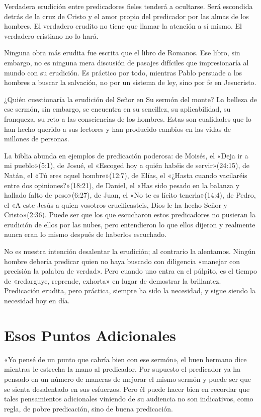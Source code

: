 \documentclass[12pt, twoside, openright]{book}
\begin{document}
Verdadera erudición entre predicadores fieles tenderá a ocultarse. Será escondida detrás de la cruz de Cristo y el amor propio del predicador por las almas de los hombres. El verdadero erudito no tiene que llamar la atención a sí mismo. El verdadero cristiano no lo hará.

Ninguna obra más erudita fue escrita que el libro de Romanos. Ese libro, sin embargo, no es ninguna mera discusión de pasajes difíciles que impresionaría al mundo con su erudición. Es práctico por todo, mientras Pablo persuade a los hombres a buscar la salvación, no por un sistema de ley, sino por fe en Jesucristo.

¿Quién cuestionaría la erudición del Señor en Su sermón del monte? La belleza de ese sermón, sin embargo, se encuentra en su sencillez, su aplicabilidad, su franqueza, su reto a las consciencias de los hombres. Estas son cualidades que lo han hecho querido a sus lectores y han producido cambios en las vidas de millones de personas.

La biblia abunda en ejemplos de predicación poderosa: de Moisés, el «Deja ir a mi pueblo»(5:1), de Josu\'e, el «Escoged hoy a quién habéis de servir»(24:15), de Natán, el «Tú eres aquel hombre»(12:7), de Elías, el «¿Hasta cuando vacilaréis entre dos opiniones?»(18:21), de Daniel, el «Has sido pesado en la balanza y hallado falto de peso»(6:27), de Juan, el «No te es lícito tenerla»(14:4), de Pedro, el «A este Jesús a quien vosotros crucificasteis, Dios le ha hecho Señor y Cristo»(2:36). Puede ser que los que escucharon estos predicadores no pusieran la erudición de ellos por las nubes, pero entendieron lo que ellos dijeron y realmente nunca eran lo mismo después de haberlos escuchado. 

No es nuestra intención desalentar la erudición; al contrario la alentamos. Ningún hombre debería predicar quien no haya buscado con diligencia «manejar con precisión la palabra de verdad». Pero cuando uno entra en el púlpito, es el tiempo de «redarguye, reprende, exhorta» en lugar de demostrar la brillantez. Predicación erudita, pero práctica, siempre ha sido la necesidad, y sigue siendo la necesidad hoy en día.

\section{Esos Puntos Adicionales}
«Yo pensé de un punto que cabría bien con ese sermón», el buen hermano dice mientras le estrecha la mano al predicador. Por supuesto el predicador ya ha pensado en un número de maneras de mejorar el mismo sermón y puede ser que se sienta desalentado en sus esfuerzos. Pero él puede hacer bien en recordar que tales pensamientos adicionales viniendo de su audiencia no son indicativos, como regla, de pobre predicación, sino de buena predicación.
\end{document}

